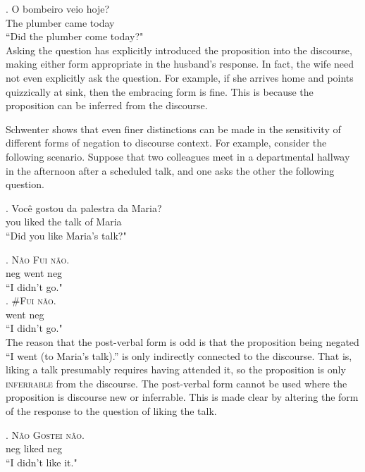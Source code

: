 \documentclass[12pt]{upenndiss}
\theoremstyle{definition} \newtheorem{definition}{Definition}
\begin{document}
\exg.  O bombeiro veio hoje?\\
       The plumber came today\\
         ``Did the plumber come today?"\\

Asking the question has explicitly introduced the proposition into the discourse, making either form appropriate in the husband's response. In fact, the wife need not even explicitly ask the question. For example, if she arrives home and points quizzically at sink, then the embracing form is fine. This is because the proposition can be inferred from the discourse.

Schwenter shows that even finer distinctions can be made in the sensitivity of different forms of negation to discourse context. For example, consider the following scenario. Suppose that two colleagues meet in a departmental hallway in the afternoon after a scheduled talk, and one asks the other the following question.

\exg. Voc{\^e} gostou da palestra da Maria?\\
	 you liked the talk of Maria\\
	 ``Did you like Maria's talk?"

\exg. \textsc{\color{blue}N{\~a}o} \textsc{\color{blue}Fui} \textsc{\color{blue}n{\~a}o}.\\
	 neg went neg\\
	 ``I didn't go."\\

\exg. \#\textsc{\color{green}Fui} \textsc{\color{green}n{\~a}o}.\\
	  went neg\\
	 ``I didn't go."\\

The reason that the post-verbal form is odd is that the proposition being negated ``I went (to Maria's talk).'' is only indirectly connected to the discourse. That is, liking a talk presumably requires having attended it, so the proposition is only \textsc{inferrable} from the discourse. The post-verbal form cannot be used where the proposition is discourse new or inferrable. This is made clear by altering the form of the response to the question of liking the talk.

\exg. \textsc{\color{blue}N{\~a}o} \textsc{\color{blue}Gostei} \textsc{\color{blue}n{\~a}o}.\\
	 neg liked neg\\
	 ``I didn't like it."\\
\end{document}
